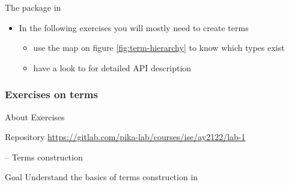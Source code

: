 \documentclass[presentation]{beamer}\mode<presentation>{\usetheme{AMSBolognaFC}}
\begin{document}
\begin{frame}[allowframebreaks]{The  package in }
\begin{itemize}
        \bigskip

        \item In the following exercises you will mostly need to create terms
        \begin{itemize}
            \item use the map on figure \ref{fig:term-hierarchy} to know \alert{which} types exist
            \item have a look to \cite{Ciatto20212pktPresentation} for detailed API description
        \end{itemize}
    \end{itemize}
\end{frame}

\subsubsection{Exercises on terms}

\begin{frame}{About Exercises}

    \begin{block}{Repository}
        \centering
        \url{https://gitlab.com/pika-lab/courses/ise/ay2122/lab-1}
    \end{block}
    
\end{frame}

\startExercise{}

\begin{frame}{\currentExercise{} -- Terms construction}
    \label{slide:first-exercise-on-terms}

    \begin{block}{Goal}
        Understand the basics of terms construction in \twopkt{}
    \end{block}
    
\end{frame}

\startExercise{}
\end{document}
